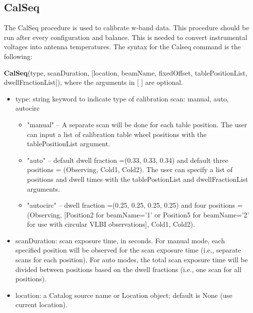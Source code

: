 \subsection{CalSeq}\label{sec:calseq}

The CalSeq procedure is used to calibrate w-band data.  This procedure
should be run after every configuration and balance.  This is needed
to convert instrumental voltages into antenna temperatures.  The
syntax for the Calseq command is the following:

{\bf CalSeq}(type, scanDuration, [location, beamName, fixedOffset,
tablePositionList, dwellFractionList]), where the arguments in [ ]
are optional.

\begin{itemize}

\item  type: string keyword to indicate type of calibration scan: manual,
  auto, autocirc

\begin{itemize}
        
\item "manual" -- A separate scan will be done for each table
  position. The user can input a list of calibration table wheel
  positions with the tablePositionList argument.

\item "auto" -- default dwell fraction =(0.33, 0.33, 0.34) and default
  three positions = (Observing, Cold1, Cold2). The user can specify a
  list of positions and dwell times with the tablePostionList and
  dwellFractionList arguments.
        
\item "autocirc" -- dwell fraction =(0.25, 0.25, 0.25, 0.25) and four
  positions = (Observing, [Position2 for beamName='1' or Position5 for
  beamName='2' for use with circular VLBI observations], Cold1,
  Cold2).

\end{itemize}


\item scanDuration: scan exposure time, in seconds. For manual mode,
  each specified position will be observed for the scan exposure time
  (i.e., separate scans for each position). For auto modes, the total
  scan exposure time will be divided between positions based on the
  dwell fractions (i.e., one scan for all positions).

\item location: a Catalog source name or Location object; default is
  None (use current location).
    

\end{itemize}
